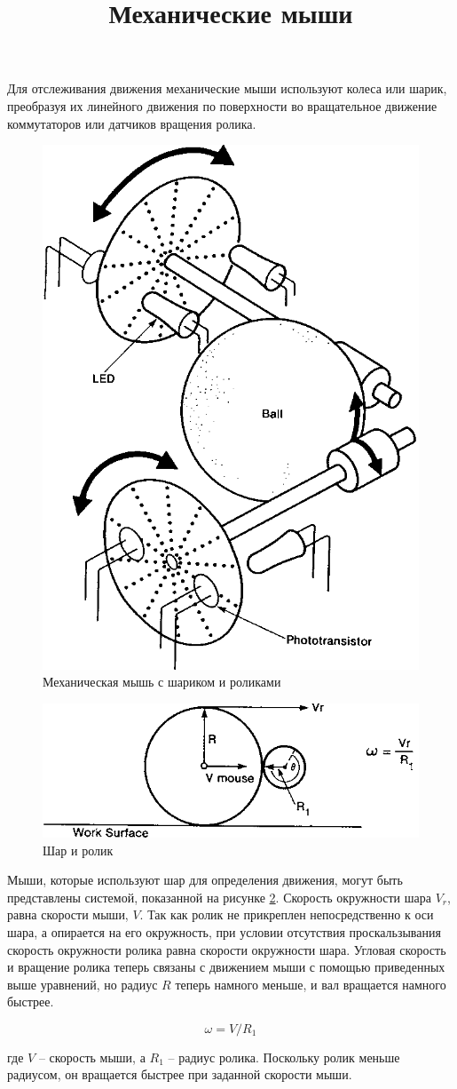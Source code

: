 \documentclass[11pt, a4paper]{article}
\begin{document}
\title{Механические мыши}

\maketitle

Для отслеживания движения механические мыши используют колеса или шарик, преобразуя их линейного движения по поверхности во вращательное движение коммутаторов или датчиков вращения ролика.

\begin{figure}[h]
    \centering
    \includegraphics[width=0.3\linewidth]{theory_mech/2.1.png}
    \caption{Механическая мышь с шариком и роликами}
    \label{fig:theoryBallOpt}
\end{figure}

\begin{figure}[h]
    \centering
    \includegraphics[width=0.3\linewidth]{theory_mech/2.2.png}
    \caption{Шар и ролик}
    \label{fig:theoryBallRoll}
\end{figure}

Мыши, которые используют шар для определения движения, могут быть представлены системой, показанной на рисунке \ref{fig:theoryBallRoll}. Скорость окружности шара $V_r$, равна скорости мыши, $V$. Так как ролик не прикреплен непосредственно к оси шара, а опирается на его окружность, при условии отсутствия проскальзывания скорость окружности ролика равна скорости окружности шара. Угловая скорость и вращение ролика теперь связаны с движением мыши с помощью приведенных выше уравнений, но радиус $R$ теперь намного меньше, и вал вращается намного быстрее.

$$\omega = V/R_1$$

\noindent где $V$ -- скорость мыши, а $R_1$ -- радиус ролика. Поскольку ролик меньше радиусом, он вращается быстрее при заданной скорости мыши.
\end{document}

